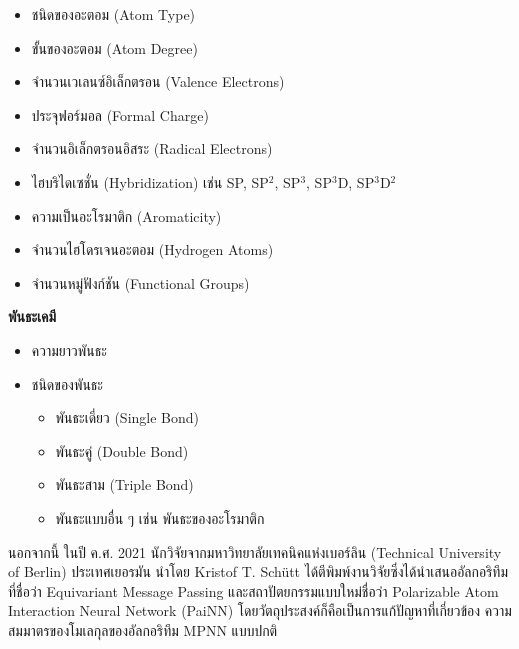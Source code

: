 \begin{itemize}[topsep=0pt]
    \item ชนิดของอะตอม (Atom Type)
    
    \item ขั้นของอะตอม (Atom Degree)
    
    \item จำนวนเวเลนซ์อิเล็กตรอน (Valence Electrons)
    
    \item ประจุฟอร์มอล (Formal Charge)
    
    \item จำนวนอิเล็กตรอนอิสระ (Radical Electrons)
    
    \item ไฮบริไดเซชั่น (Hybridization) เช่น SP, SP$^2$, SP$^3$, SP$^3$D, SP$^3$D$^2$
    
    \item ความเป็นอะโรมาติก (Aromaticity)
    
    \item จำนวนไฮโดรเจนอะตอม (Hydrogen Atoms)
    
    \item จำนวนหมู่ฟังก์ชัน (Functional Groups)
\end{itemize}

\medskip

\noindent \textbf{พันธะเคมี}

\begin{itemize}[topsep=0pt]
    \item ความยาวพันธะ
    
    \item ชนิดของพันธะ
    \begin{itemize}[topsep=0pt]
        \item พันธะเดี่ยว (Single Bond)
        
        \item พันธะคู่ (Double Bond)
        
        \item พันธะสาม (Triple Bond)
        
        \item พันธะแบบอื่น ๆ เช่น พันธะของอะโรมาติก
    \end{itemize}
\end{itemize}

นอกจากนี้ ในปี ค.ศ. 2021 นักวิจัยจากมหาวิทยาลัยเทคนิคแห่งเบอร์ลิน (Technical University of Berlin) ประเทศเยอรมัน นำโดย 
Kristof T. Sch\"{u}tt ได้ตีพิมพ์งานวิจัยซึ่งได้นำเสนออัลกอริทึมที่ชื่อว่า Equivariant Message Passing และสถาปัตยกรรมแบบใหม่ชื่อว่า 
Polarizable Atom Interaction Neural Network (PaiNN)\autocite{schutt2021} โดยวัตถุประสงค์ก็คือเป็นการแก้ปัญหาที่เกี่ยวข้อง%
ความสมมาตรของโมเลกุลของอัลกอริทึม MPNN แบบปกติ

